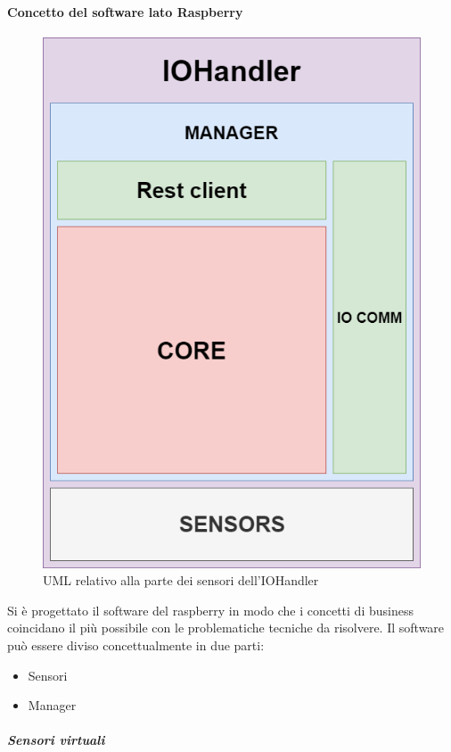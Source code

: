 \documentclass[12pt]{article}
\begin{document}
\paragraph{Concetto del software lato Raspberry}
\begin{figure}[h!]
\centering
	\includegraphics[scale=0.60]{img/parteLocale/[SmartCity]MappaConcettualeSWRaspberry.png}  
    \caption{UML relativo alla parte dei sensori dell'IOHandler}
\end{figure}
Si è progettato il software del raspberry in modo che i concetti di business coincidano il più possibile con le problematiche tecniche da risolvere.
Il software può essere diviso concettualmente in due parti:
\begin{itemize}
\item Sensori
\item Manager
\end{itemize}
\subparagraph{Sensori virtuali}
\end{document}

